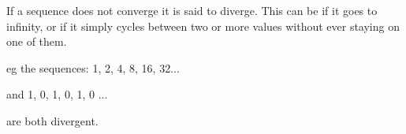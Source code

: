 If a sequence does not converge it is said to diverge. This can be if it
goes to infinity, or if it simply cycles between two or more values without ever 
staying on one of them.
\par
eg the sequences: 1, 2, 4, 8, 16, 32...
\par
and 1, 0, 1, 0, 1, 0 ...
\par
are both divergent.